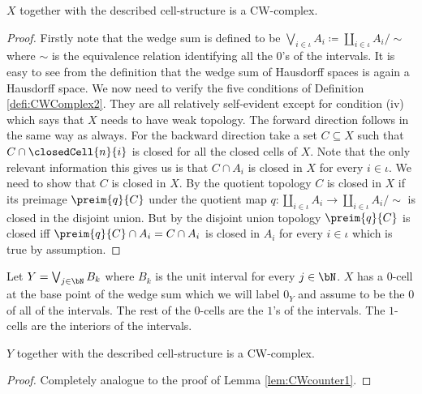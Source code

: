 \begin{lem} \label{lem:CWcounter1}
    $X$ together with the described cell-structure is a CW-complex.
\end{lem}
\begin{proof}
    Firstly note that the wedge sum is defined to be $\bigvee_{i \in \iota} A_i \coloneq \coprod_{i \in \iota} A_i / \sim$ where $\sim$ is the equivalence relation identifying all the $0$'s of the intervals. 
    It is easy to see from the definition that the wedge sum of Hausdorff spaces is again a Hausdorff space. 
    We now need to verify the five conditions of Definition \ref{defi:CWComplex2}. 
    They are all relatively self-evident except for condition (iv) which says that $X$ needs to have weak topology. 
    The forward direction follows in the same way as always. 
    For the backward direction take a set $C \subseteq X$ such that $C \cap \closedCell{n}{i}$ is closed for all the closed cells of $X$. 
    Note that the only relevant information this gives us is that $C \cap A_i$ is closed in $X$ for every $i \in \iota$.
    We need to show that $C$ is closed in $X$. 
    By the quotient topology $C$ is closed in $X$ if its preimage $\preim{q}{C}$ under the quotient map $q \colon \coprod_{i \in \iota} A_i \to \coprod_{i \in \iota} A_i / \sim$ is closed in the disjoint union. 
    But by the disjoint union topology $\preim{q}{C}$ is closed iff $\preim{q}{C} \cap A_i = C \cap A_i$ is closed in $A_i$ for every $i \in \iota$ which is true by assumption. 
\end{proof}

\begin{defi}
    Let $Y = \bigvee_{j \in \bN}B_k$ where $B_k$ is the unit interval for every $j \in \bN$.
    $X$ has a $0$-cell at the base point of the wedge sum which we will label $0_Y$ and assume to be the $0$ of all of the intervals. The rest of the $0$-cells are the $1$'s of the intervals. 
    The $1$-cells are the interiors of the intervals. 
\end{defi}

\begin{lem}
    $Y$ together with the described cell-structure is a CW-complex.
\end{lem}
\begin{proof}
    Completely analogue to the proof of Lemma \ref{lem:CWcounter1}.
\end{proof}

